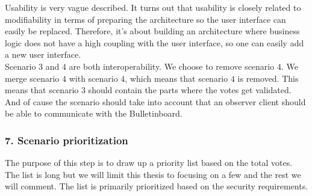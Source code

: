 \noindent
Usability is very vague described. It turns out that usability is closely related to modifiability in terms of preparing the architecture so the user interface can easily be replaced. Therefore, it's about building an architecture where business logic does not have a high coupling with the user interface, so one can easily add a new user interface. \\ 

\noindent
Scenario $3$ and $4$ are both interoperability. We choose to remove scenario $4$.  We merge scenario $4$ with scenario $4$, which means that scenario $4$ is removed. This means that scenario $3$ should contain the parts where the votes get validated. And of cause the scenario should take into account that an observer client should be able to communicate with the Bulletinboard.



\subsubsection{7. Scenario prioritization}
The purpose of this step is to draw up a priority list based on the total votes. The list is long but we will limit this thesis to focusing on a few and the rest we will comment. The list is primarily prioritized based on the security requirements.


